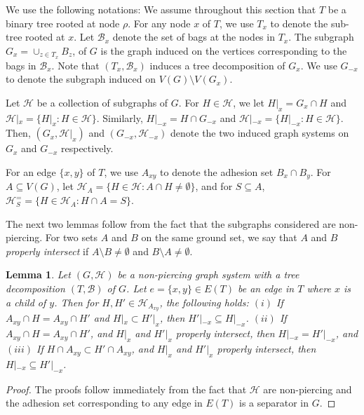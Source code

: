 \documentclass[12pt]{article}
\newcommand{\BB}{\mathcal{B}}
\newcommand{\HH}{\mathcal{H}}
\newtheorem{lemma}[theorem]{Lemma}
\theoremstyle{case}
\begin{document}
We use the following notations: We assume throughout this section that $T$ be a binary tree rooted at node $\rho$. For any node $x$ of $T$, we use $T_x$ to denote the sub-tree rooted at $x$.
Let $\BB_x$ denote the set of bags at the nodes in $T_x$.
The subgraph $G_x=\cup_{z\in T_x}B_z$, of $G$ is the graph induced on the vertices corresponding
to the bags in $\BB_x$.
Note that $(T_x,\BB_x)$ induces a tree decomposition of $G_x$.
We use $G_{-x}$ to denote the subgraph induced on $V(G)\setminus V(G_x)$.

Let $\HH$ be a collection of subgraphs of $G$.
For $H\in\mathcal{H}$, we let $H|_x=G_x\cap H$ 
and $\mathcal{H}|_x=\{H|_x: H\in\mathcal{H}\}$.
Similarly, $H|_{-x}=H\cap G_{-x}$ and $\mathcal{H}|_{-x}=\{H|_{-x}: H\in\mathcal{H}\}$.
Then, $(G_x,\mathcal{H}|_x)$ and $(G_{-x},\HH_{-x})$ denote
the two induced graph systems on $G_x$ and $G_{-x}$ respectively.

For an edge $\{x,y\}$ of $T$, we use $A_{xy}$ to denote the adhesion set $B_x\cap B_y$.
For $A\subseteq V(G)$, let
$\mathcal{H}_A=\{H\in\mathcal{H}: A\cap H\neq\emptyset\}$, and
for $S\subseteq A$,
$\mathcal{H}^=_S=\{H\in\mathcal{H}_A: H\cap A = S\}$.

The next two lemmas follow
from the fact that the subgraphs considered are non-piercing.
For two sets $A$ and $B$ on the same ground set, we say that $A$ and $B$ \emph{properly intersect} 
if $A\setminus B\neq\emptyset$ and $B\setminus A\neq\emptyset$.

\begin{lemma}
\label{lem:npsep}
Let $(G,\mathcal{H})$ be a non-piercing graph system with
a tree decomposition $(T,\mathcal{B})$ of $G$.
Let $e=\{x,y\}\in E(T)$ be an edge in $T$ where $x$ is a child of $y$.
Then for $H, H'\in\mathcal{H}_{A_{xy}}$, the following holds:
$(i)$ If $A_{xy}\cap H=A_{xy}\cap H'$ and $H|_x\subset H'|_x$, then
$H'|_{-x}\subseteq H|_{-x}$. $(ii)$ If $A_{xy}\cap H=A_{xy}\cap H'$, 
and $H|_x$ and $H'|_x$ properly intersect,
then $H|_{-x}=H'|_{-x}$, and $(iii)$ If $H\cap A_{xy}\subset H'\cap A_{xy}$, and $H|_x$ and $H'|_x$ properly intersect, then $H|_{-x}\subseteq H'|_{-x}$.
\end{lemma}

\begin{proof}
The proofs follow immediately from the fact that $\mathcal{H}$
are non-piercing and the adhesion set corresponding to 
any edge in $E(T)$ is a separator in $G$.
\end{proof}
\end{document}
